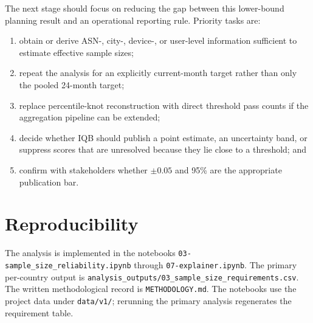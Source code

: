 \documentclass[11pt]{article}
\begin{document}
The next stage should focus on reducing the gap between this lower-bound planning result and an
operational reporting rule. Priority tasks are:
\begin{enumerate}
  \item obtain or derive ASN-, city-, device-, or user-level information sufficient to estimate
  effective sample sizes;
  \item repeat the analysis for an explicitly current-month target rather than only the pooled
  24-month target;
  \item replace percentile-knot reconstruction with direct threshold pass counts if the aggregation
  pipeline can be extended;
  \item decide whether IQB should publish a point estimate, an uncertainty band, or suppress scores
  that are unresolved because they lie close to a threshold; and
  \item confirm with stakeholders whether $\pm0.05$ and 95\% are the appropriate publication bar.
\end{enumerate}

\section*{Reproducibility}

The analysis is implemented in the notebooks \texttt{03-sample\_size\_reliability.ipynb} through
\texttt{07-explainer.ipynb}. The primary per-country output is
\texttt{analysis\_outputs/03\_sample\_size\_requirements.csv}. The written methodological record
is \texttt{METHODOLOGY.md}. The notebooks use the project data under \texttt{data/v1/}; rerunning
the primary analysis regenerates the requirement table.
\end{document}
